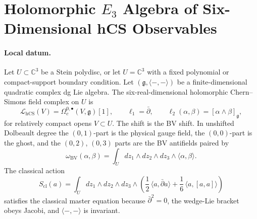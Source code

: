 
\providecommand{\Obs}{\mathrm{Obs}}
\providecommand{\hCS}{\mathrm{hCS}}
\providecommand{\Ch}{\mathrm{Ch}}
\providecommand{\Dolb}{\mathrm{Dolb}}
\providecommand{\Conf}{\mathrm{Conf}}
\providecommand{\Fact}{\mathrm{Fact}}
\providecommand{\dbar}{\bar\partial}
\providecommand{\CE}{\mathrm{CE}}
\providecommand{\HH}{\mathrm{HH}}
\providecommand{\Perf}{\mathrm{Perf}}
\providecommand{\Sym}{\mathrm{Sym}}
\providecommand{\BV}{\mathrm{BV}}
\providecommand{\QME}{\mathrm{QME}}
\providecommand{\CoHA}{\mathrm{CoHA}}
\providecommand{\Rep}{\mathrm{Rep}}
\providecommand{\Tr}{\operatorname{Tr}}
\providecommand{\End}{\operatorname{End}}
\providecommand{\Ran}{\mathrm{Ran}}
\providecommand{\C}{\mathbb{C}}
\providecommand{\R}{\mathbb{R}}
\providecommand{\cO}{\mathcal{O}}
\providecommand{\cW}{\mathcal{W}}
\providecommand{\fg}{\mathfrak{g}}
\providecommand{\Eone}{E_1}
\providecommand{\Etwo}{E_2}
\providecommand{\Ethree}{E_3}
\providecommand{\PhiFA}{\Phi^{\mathrm{FA}}}
\providecommand{\SpCh}{\mathrm{Sp}^{\mathrm{ch}}}
\providecommand{\Zchder}{Z^{\mathrm{der}}_{\mathrm{ch}}}

\section*{Holomorphic \texorpdfstring{$E_3$}{E3} Algebra of Six-Dimensional hCS Observables}

\paragraph{Local datum.}
Let \(U\subset\C^3\) be a Stein polydisc, or let \(U=\C^3\) with a
fixed polynomial or compact-support boundary condition. Let
\((\fg,\langle-,-\rangle)\) be a finite-dimensional quadratic complex dg
Lie algebra. The six-real-dimensional holomorphic Chern--Simons field
complex on \(U\) is
\[
  \mathscr L_{\hCS}(V)
  =
  \Omega^{0,\bullet}_c(V,\fg)[1],
  \qquad
  \ell_1=\dbar,\qquad
  \ell_2(\alpha,\beta)=[\alpha\wedge\beta]_{\fg},
\]
for relatively compact opens \(V\subset U\). The shift is the BV shift.
In unshifted Dolbeault degree the \((0,1)\)-part is the physical gauge
field, the \((0,0)\)-part is the ghost, and the \((0,2)\), \((0,3)\)
parts are the BV antifields paired by
\[
  \omega_{\BV}(\alpha,\beta)
  =
  \int_U dz_1\wedge dz_2\wedge dz_3\wedge\langle\alpha,\beta\rangle .
\]
The classical action
\[
  S_{\mathrm{cl}}(a)=
  \int_U dz_1\wedge dz_2\wedge dz_3\wedge
  \left(
    \frac12\,\langle a,\dbar a\rangle
    +\frac16\,\langle a,[a,a]\rangle
  \right)
\]
satisfies the classical master equation because \(\dbar^2=0\), the
wedge-Lie bracket obeys Jacobi, and \(\langle-,-\rangle\) is invariant.

